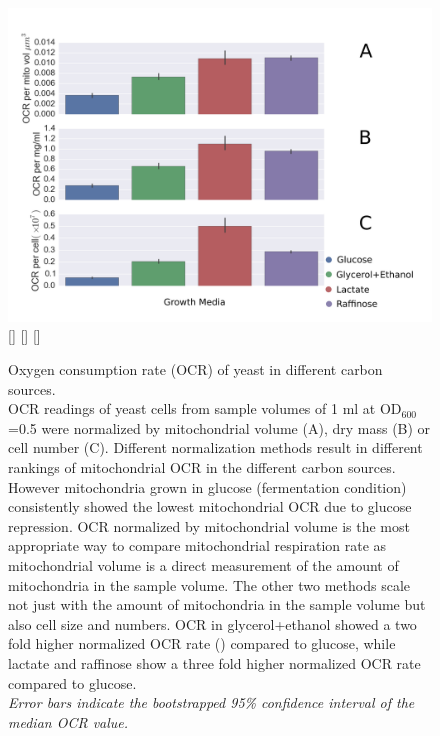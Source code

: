 \begin{figure}[htp]
	\centering
    \includegraphics[width=\textwidth]{o2bars}
     [\linewidth]{}
      [\linewidth]{}
       [\linewidth]{}
    \caption[Oxygen consumption rate (OCR) of yeast in different carbon sources.]{Oxygen consumption rate (OCR) of yeast in different carbon sources.\\OCR readings of yeast cells from sample volumes of 1 ml at OD$_{600}$=0.5 were normalized by mitochondrial volume (A), dry mass (B) or cell number (C). Different normalization methods result in different rankings of mitochondrial OCR in the different carbon sources. However mitochondria grown in glucose (fermentation condition) consistently showed the lowest mitochondrial OCR due to glucose repression. OCR normalized by mitochondrial volume is the most appropriate way to compare mitochondrial respiration rate as mitochondrial volume is a direct measurement of the amount of mitochondria in the sample volume. The other two methods scale not just with the amount of mitochondria in the sample volume but also cell size and numbers. OCR in glycerol+ethanol showed a two fold higher normalized OCR rate () compared to glucose, while lactate and raffinose show a three fold higher normalized OCR rate compared to glucose.\\\emph{Error bars indicate the bootstrapped 95\% confidence interval of the median OCR value.}}\label{fig:O2bars}
\end{figure}
%

